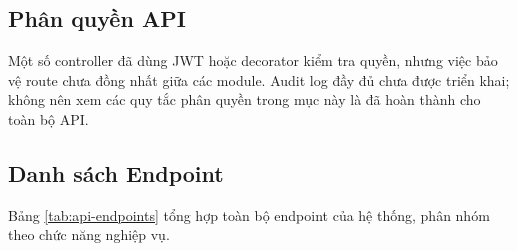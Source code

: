\subsection{Phân quyền API}

Một số controller đã dùng JWT hoặc decorator kiểm tra quyền, nhưng việc bảo vệ route chưa đồng nhất giữa các module. Audit log đầy đủ chưa được triển khai; không nên xem các quy tắc phân quyền trong mục này là đã hoàn thành cho toàn bộ API.

\subsection{Danh sách Endpoint}

Bảng \ref{tab:api-endpoints} tổng hợp toàn bộ endpoint của hệ thống, phân nhóm theo chức năng nghiệp vụ.

